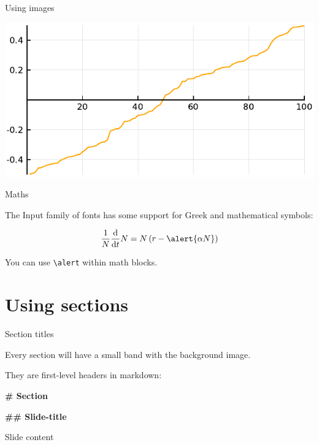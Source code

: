 \documentclass[11pt, compress, aspectratio=1610]{beamer}
\newenvironment{Shaded}{\begin{mdframed}}{\end{mdframed}}
\newcommand{\FunctionTok}[1]{\textcolor[HTML]{26A69A}{\textbf{{#1}}}}
\newcommand{\NormalTok}[1]{\textcolor[HTML]{212121}{{#1}}}
\let\OldTexttt\texttt
\renewcommand{\texttt}[1]{\OldTexttt{\color{plTT}#1}}
\begin{document}
\begin{frame}{Using images}

\includegraphics[width=\textwidth]{figures/density.pdf}

\end{frame}

\begin{frame}[fragile]{Maths}

The Input family of fonts has some support for Greek and mathematical
symbols:

\[
\frac{1}{N}\frac{\text{d}}{\text{d}t}N = N\left(r-\alert{\alpha N}\right)
\]

You can use \texttt{\textbackslash{}alert} within math blocks.

\end{frame}

\section{Using sections}\label{using-sections}

\begin{frame}[fragile]{Section titles}

Every section will have a small band with the background image.

They are first-level headers in markdown:

\begin{Shaded}
\begin{Highlighting}[]
\FunctionTok{# Section}

\FunctionTok{## Slide-title}

\NormalTok{Slide content}
\end{Highlighting}
\end{Shaded}

\end{frame}
\end{document}
